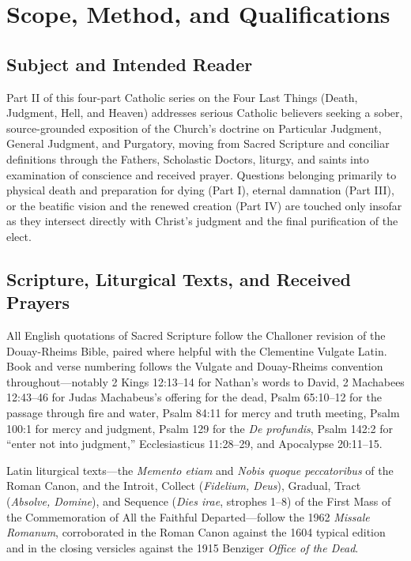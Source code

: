\section{Scope, Method, and Qualifications}

\subsection*{Subject and Intended Reader}

Part II of this four-part Catholic series on the Four Last Things (Death, Judgment, Hell, and Heaven) addresses serious Catholic believers seeking a sober, source-grounded exposition of the Church's doctrine on Particular Judgment, General Judgment, and Purgatory, moving from Sacred Scripture and conciliar definitions through the Fathers, Scholastic Doctors, liturgy, and saints into examination of conscience and received prayer. Questions belonging primarily to physical death and preparation for dying (Part I), eternal damnation (Part III), or the beatific vision and the renewed creation (Part IV) are touched only insofar as they intersect directly with Christ's judgment and the final purification of the elect.

\subsection*{Scripture, Liturgical Texts, and Received Prayers}

All English quotations of Sacred Scripture follow the Challoner revision of the Douay-Rheims Bible, paired where helpful with the Clementine Vulgate Latin. Book and verse numbering follows the Vulgate and Douay-Rheims convention throughout---notably 2 Kings 12:13--14 for Nathan's words to David, 2 Machabees 12:43--46 for Judas Machabeus's offering for the dead, Psalm 65:10--12 for the passage through fire and water, Psalm 84:11 for mercy and truth meeting, Psalm 100:1 for mercy and judgment, Psalm 129 for the \textit{De profundis}, Psalm 142:2 for ``enter not into judgment,'' Ecclesiasticus 11:28--29, and Apocalypse 20:11--15.

Latin liturgical texts---the \textit{Memento etiam} and \textit{Nobis quoque peccatoribus} of the Roman Canon, and the Introit, Collect (\textit{Fidelium, Deus}), Gradual, Tract (\textit{Absolve, Domine}), and Sequence (\textit{Dies irae}, strophes 1--8) of the First Mass of the Commemoration of All the Faithful Departed---follow the 1962 \textit{Missale Romanum}, corroborated in the Roman Canon against the 1604 typical edition and in the closing versicles against the 1915 Benziger \textit{Office of the Dead}.

